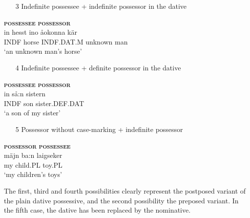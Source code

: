 \z 
\z

\begin{enumerate} 
\item[3] Indefinite possessee + indefinite possessor in the dative
\end{enumerate} 

\ea 
{}
\glll \textbf{\textsc{possessee}} \textbf{\textsc{possessor}}\\
in  hesst  ino  åokonna  kär\\
INDF  horse  INDF.DAT.M  unknown  man\\
\glt  ‘an unknown man’s horse’
\z

\begin{enumerate}
\item[4] Indefinite possessee + definite possessor in the dative
\end{enumerate} 


\ea\label{}
\glll \textbf{\textsc{possessee}} \textbf{\textsc{possessor}}\\
in  så:n  sistern\\
INDF  son  sister.DEF.DAT\\
\glt ‘a son of my sister’
\z

\begin{enumerate}
\item[5] Possessor without case-marking + indefinite possessor
\end{enumerate}


\ea\label{}
\glll \textbf{\textsc{possessor}} \textbf{\textsc{possessee}}\\
mäjn  ba:n  laigseker\\
my  child.PL  toy.PL\\
\glt ‘my children’s toys’
\z

The first, third and fourth possibilities clearly represent the postposed variant of the plain dative possessive, and the second possibility the preposed variant. In the fifth case, the dative has been replaced by the nominative.  

